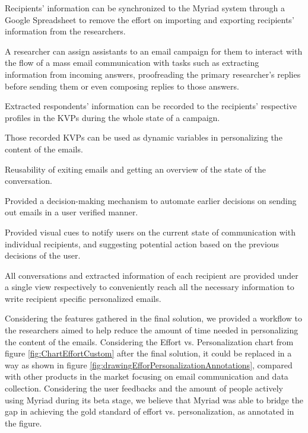 \begin{compactitem}
	\item Recipients' information can be synchronized to the Myriad system through a Google Spreadsheet to remove the effort on importing and exporting recipients' information from the researchers.
	\item A researcher can assign assistants to an email campaign for them to interact with the flow of a mass email communication with tasks such as extracting information from incoming answers, proofreading the primary researcher's replies before sending them or even composing replies to those answers.
	\item Extracted respondents' information can be recorded to the recipients' respective profiles in the \ac{KVP}s during the whole state of a campaign. 
	\item Those recorded \ac{KVP}s can be used as dynamic variables in personalizing the content of the emails.
	\item Reusability of exiting emails and getting an overview of the state of the conversation.
	\item Provided a decision-making mechanism to automate earlier decisions on sending out emails in a user verified manner.
	\item Provided visual cues to notify users on the current state of communication with individual recipients, and suggesting potential action based on the previous decisions of the user.
	\item All conversations and extracted information of each recipient are provided under a single view respectively to conveniently reach all the necessary information to write recipient specific personalized emails.
 \end{compactitem}

Considering the features gathered in the final solution, we provided a workflow to the researchers aimed to help reduce the amount of time needed in personalizing the content of the emails. Considering the Effort vs. Personalization chart from figure \ref{fig:ChartEffortCustom} after the final solution, it could be replaced in a way as shown in figure \ref{fig:drawingEfforPersonalizationAnnotations}, compared with other products in the market focusing on email communication and data collection. Considering the user feedbacks and the amount of people actively using Myriad during its beta stage, we believe that Myriad was able to bridge the gap in achieving the gold standard of effort vs. personalization, as annotated in the figure.
\vspace{1cm}

